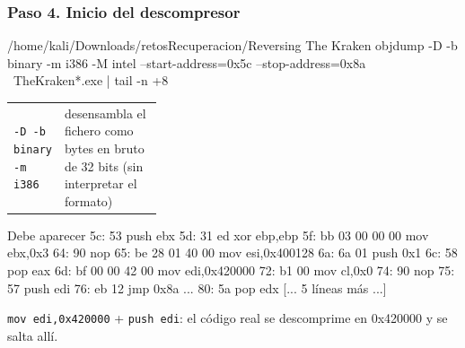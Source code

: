 \documentclass[11pt,a4paper]{article}
\begin{document}
\subsubsection*{Paso 4. Inicio del descompresor}
\begin{comando}{/home/kali/Downloads/retosRecuperacion/Reversing The Kraken}
objdump -D -b binary -m i386 -M intel --start-address=0x5c --stop-address=0x8a \
  TheKraken*.exe | tail -n +8
\end{comando}
\begin{tcolorbox}[enhanced, breakable, colback=gray!3, colframe=gray!35, boxrule=0.3pt, arc=1pt, left=4pt, right=4pt, top=2pt, bottom=2pt, fonttitle=\sffamily\scriptsize\bfseries, coltitle=black!70, colbacktitle=gray!10, title={Qué hace cada parte}, attach title to upper, before skip=2pt, after skip=4pt, fontupper=\small]
\par{\renewcommand{\arraystretch}{1.12}\begin{tabularx}{\linewidth}{@{}>{\raggedright\arraybackslash}p{0.33\linewidth}>{\raggedright\arraybackslash}X@{}}
\texttt{-D -b binary -m i386} & desensambla el fichero como bytes en bruto de 32 bits (sin interpretar el formato) \\
\end{tabularx}}
\end{tcolorbox}
\begin{salida}{Debe aparecer}
  5c:   53                      push   ebx
  5d:   31 ed                   xor    ebp,ebp
  5f:   bb 03 00 00 00          mov    ebx,0x3
  64:   90                      nop
  65:   be 28 01 40 00          mov    esi,0x400128
  6a:   6a 01                   push   0x1
  6c:   58                      pop    eax
  6d:   bf 00 00 42 00          mov    edi,0x420000
  72:   b1 00                   mov    cl,0x0
  74:   90                      nop
  75:   57                      push   edi
  76:   eb 12                   jmp    0x8a
        ...
  80:   5a                      pop    edx
[... 5 líneas más ...]
\end{salida}
\begin{nota}\texttt{mov edi,0x420000} + \texttt{push edi}: el código real se descomprime en 0x420000 y se salta allí.\end{nota}
\end{document}
